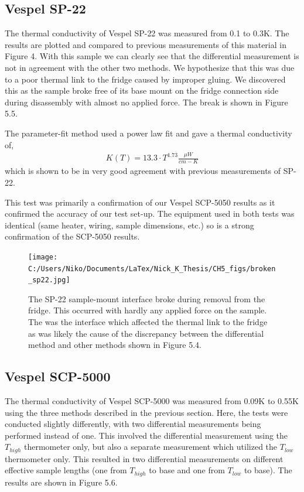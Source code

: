 \documentclass{report}
\begin{document}
\subsection{Vespel SP-22}
The thermal conductivity of Vespel SP-22 was measured from 0.1 to 0.3K. The results are plotted and compared to previous measurements of this material in Figure 4. With this sample we can clearly see that the differential measurement is not in agreement with the other two methods. We hypothesize that this was due to a poor thermal link to the fridge caused by improper gluing. We discovered this as the sample broke free of its base mount on the fridge connection side during disassembly with almost no applied force. The break is shown in Figure 5.5.

The parameter-fit method used a power law fit and gave a thermal conductivity of,
\begin{eqnarray}
K(T) = 13.3 \cdot T^{1.73} \frac{\mu W}{cm-K}
\end{eqnarray}
which is shown to be in very good agreement with previous measurements of SP-22.

This test was primarily a confirmation of our Vespel SCP-5050 results as it confirmed the accuracy of our test set-up. The equipment used in both tests was identical (same heater, wiring, sample dimensions, etc.) so is a strong confirmation of the SCP-5050 results.

\begin{figure}
\texttt{[image: C:/Users/Niko/Documents/LaTex/Nick\_K\_Thesis/CH5\_figs/broken\_sp22.jpg]}
\caption{The SP-22 sample-mount interface broke during removal from the fridge. This occurred with hardly any applied force on the sample. The was the interface which affected the thermal link to the fridge as was likely the cause of the discrepancy between the differential method and other methods shown in Figure 5.4.}
\end{figure}

\subsection{Vespel SCP-5000}
The thermal conductivity of Vespel SCP-5000 was measured from 0.09K to 0.55K using the three methods described in the previous section. Here, the tests were conducted slightly differently, with two differential measurements being performed instead of one. This involved the differential measurement using the $T_{high}$ thermometer only, but also a separate measurement which utilized the $T_{low}$ thermometer only. This resulted in two differential measurements on different effective sample lengths (one from $T_{high}$ to base and one from $T_{low}$ to base). The results are shown in Figure 5.6.
\end{document}

